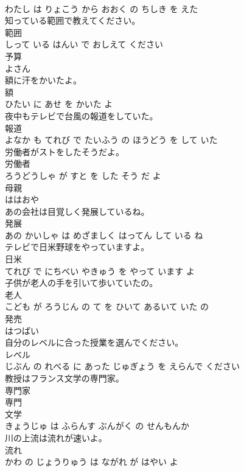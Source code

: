 \documentclass[8pt]{extreport}
\begin{document}
\begin{CJK}{UTF8}{min}
\\	わたし は りょこう から おおく の ちしき を えた			
\\	知っている範囲で教えてください。	
\\	範囲 
\\	しって いる はんい で おしえて ください			
\\	予算	
\\	よさん		
\\	額に汗をかいたよ。	
\\	額 
\\	ひたい に あせ を かいた よ			
\\	夜中もテレビで台風の報道をしていた。	
\\	報道 
\\	よなか も てれび で たいふう の ほうどう を して いた			
\\	労働者がストをしたそうだよ。	
\\	労働者 
\\	ろうどうしゃ が すと を した そう だ よ			
\\	母親	
\\	ははおや		
\\	あの会社は目覚しく発展しているね。	
\\	発展 
\\	あの かいしゃ は めざましく はってん して いる ね			
\\	テレビで日米野球をやっていますよ。	
\\	日米 
\\	てれび で にちべい やきゅう を やって います よ			
\\	子供が老人の手を引いて歩いていたの。	
\\	老人 
\\	こども が ろうじん の て を ひいて あるいて いた の			
\\	発売	
\\	はつばい		
\\	自分のレベルに合った授業を選んでください。	
\\	レベル 
\\	じぶん の れべる に あった じゅぎょう を えらんで ください			
\\	教授はフランス文学の専門家。	
\\	専門家 
\\	専門 
\\	文学 
\\	きょうじゅ は ふらんす ぶんがく の せんもんか			
\\	川の上流は流れが速いよ。	
\\	流れ 
\\	かわ の じょうりゅう は ながれ が はやい よ			

\end{CJK}
\end{document}
